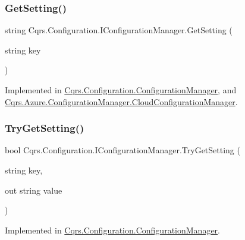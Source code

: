 \subsubsection{\texorpdfstring{Get\+Setting()}{GetSetting()}}
{\footnotesize\ttfamily string Cqrs.\+Configuration.\+I\+Configuration\+Manager.\+Get\+Setting (\begin{DoxyParamCaption}\item[{string}]{key }\end{DoxyParamCaption})}



Implemented in \hyperlink{classCqrs_1_1Configuration_1_1ConfigurationManager_ac3e31af665b95b781fee23f577170a63_ac3e31af665b95b781fee23f577170a63}{Cqrs.\+Configuration.\+Configuration\+Manager}, and \hyperlink{classCqrs_1_1Azure_1_1ConfigurationManager_1_1CloudConfigurationManager_a48228b7e2204a2449426de32cd6ecc65_a48228b7e2204a2449426de32cd6ecc65}{Cqrs.\+Azure.\+Configuration\+Manager.\+Cloud\+Configuration\+Manager}.

\mbox{\label{interfaceCqrs_1_1Configuration_1_1IConfigurationManager_ac4478405e3d9e1c97d14953aea4e695b_ac4478405e3d9e1c97d14953aea4e695b}} 
\subsubsection{\texorpdfstring{Try\+Get\+Setting()}{TryGetSetting()}\hspace{0.1cm}{\footnotesize\ttfamily [1/2]}}
{\footnotesize\ttfamily bool Cqrs.\+Configuration.\+I\+Configuration\+Manager.\+Try\+Get\+Setting (\begin{DoxyParamCaption}\item[{string}]{key,  }\item[{out string}]{value }\end{DoxyParamCaption})}



Implemented in \hyperlink{classCqrs_1_1Configuration_1_1ConfigurationManager_ad87af2a011af065d6d3e0d2ff01c7f6e_ad87af2a011af065d6d3e0d2ff01c7f6e}{Cqrs.\+Configuration.\+Configuration\+Manager}.

